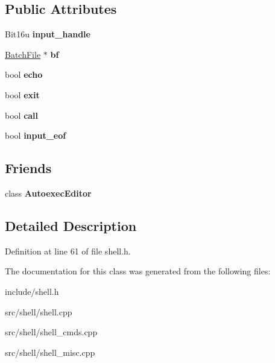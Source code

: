 \subsection*{Public Attributes}
\begin{DoxyCompactItemize}
\item 
\hypertarget{classDOS__Shell_ae7e99ec60f0525ac0b2824e2ae020fa2}{Bit16u {\bfseries input\-\_\-handle}}\label{classDOS__Shell_ae7e99ec60f0525ac0b2824e2ae020fa2}

\item 
\hypertarget{classDOS__Shell_a812e2fbcc49d3523e5939235c1784a8f}{\hyperlink{classBatchFile}{Batch\-File} $\ast$ {\bfseries bf}}\label{classDOS__Shell_a812e2fbcc49d3523e5939235c1784a8f}

\item 
\hypertarget{classDOS__Shell_ab4ee052352ed1dedccf0854bcacadac2}{bool {\bfseries echo}}\label{classDOS__Shell_ab4ee052352ed1dedccf0854bcacadac2}

\item 
\hypertarget{classDOS__Shell_ad687b7ce53d445c65c56891acd4aa660}{bool {\bfseries exit}}\label{classDOS__Shell_ad687b7ce53d445c65c56891acd4aa660}

\item 
\hypertarget{classDOS__Shell_a97d3128aca26624607d9e3acd183cfae}{bool {\bfseries call}}\label{classDOS__Shell_a97d3128aca26624607d9e3acd183cfae}

\item 
\hypertarget{classDOS__Shell_afe355c7cf53320fef3c696ee73d4de47}{bool {\bfseries input\-\_\-eof}}\label{classDOS__Shell_afe355c7cf53320fef3c696ee73d4de47}

\end{DoxyCompactItemize}
\subsection*{Friends}
\begin{DoxyCompactItemize}
\item 
\hypertarget{classDOS__Shell_abca6adc7a2081b5b03c267fdae1d0b8d}{class {\bfseries Autoexec\-Editor}}\label{classDOS__Shell_abca6adc7a2081b5b03c267fdae1d0b8d}

\end{DoxyCompactItemize}


\subsection{Detailed Description}


Definition at line 61 of file shell.\-h.



The documentation for this class was generated from the following files\-:\begin{DoxyCompactItemize}
\item 
include/shell.\-h\item 
src/shell/shell.\-cpp\item 
src/shell/shell\-\_\-cmds.\-cpp\item 
src/shell/shell\-\_\-misc.\-cpp\end{DoxyCompactItemize}
